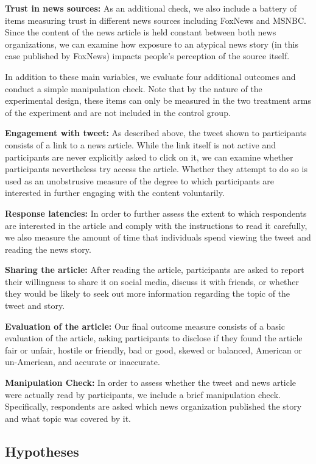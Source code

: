 \documentclass[]{article}
\begin{document}
\textbf{Trust in news sources:} As an additional check, we also include
a battery of items measuring trust in different news sources including
FoxNews and MSNBC. Since the content of the news article is held
constant between both news organizations, we can examine how exposure to
an atypical news story (in this case published by FoxNews) impacts
people's perception of the source itself.

In addition to these main variables, we evaluate four additional
outcomes and conduct a simple manipulation check. Note that by the
nature of the experimental design, these items can only be measured in
the two treatment arms of the experiment and are not included in the
control group.

\textbf{Engagement with tweet:} As described above, the tweet shown to
participants consists of a link to a news article. While the link itself
is not active and participants are never explicitly asked to click on
it, we can examine whether participants nevertheless try access the
article. Whether they attempt to do so is used as an unobstrusive
measure of the degree to which participants are interested in further
engaging with the content voluntarily.

\textbf{Response latencies:} In order to further assess the extent to
which respondents are interested in the article and comply with the
instructions to read it carefully, we also measure the amount of time
that individuals spend viewing the tweet and reading the news story.

\textbf{Sharing the article:} After reading the article, participants
are asked to report their willingness to share it on social media,
discuss it with friends, or whether they would be likely to seek out
more information regarding the topic of the tweet and story.

\textbf{Evaluation of the article:} Our final outcome measure consists
of a basic evaluation of the article, asking participants to disclose if
they found the article fair or unfair, hostile or friendly, bad or good,
skewed or balanced, American or un-American, and accurate or inaccurate.

\textbf{Manipulation Check:} In order to assess whether the tweet and
news article were actually read by participants, we include a brief
manipulation check. Specifically, respondents are asked which news
organization published the story and what topic was covered by it.

\hypertarget{hypotheses}{%
\subsection{Hypotheses}\label{hypotheses}}
\end{document}
